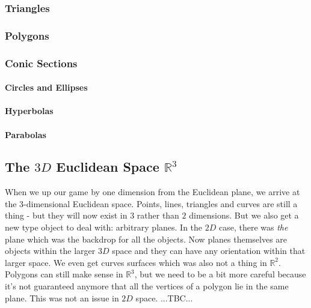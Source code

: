\subsubsection{Triangles}


\subsubsection{Polygons}


\subsubsection{Conic Sections}

\paragraph{Circles and Ellipses}

\paragraph{Hyperbolas}

\paragraph{Parabolas}






\subsection{The $3D$ Euclidean Space $\mathbb{R}^3$}
When we up our game by one dimension from the Euclidean plane, we arrive at the $3$-dimensional Euclidean space. Points, lines, triangles and curves are still a thing - but they will now exist in $3$ rather than $2$ dimensions. But we also get a new type object to deal with: arbitrary planes. In the $2D$ case, there was \emph{the} plane which was the backdrop for all the objects. Now planes themselves are objects within the larger $3D$ space and they can have any orientation within that larger space. We even get curves surfaces which was also not a thing in $\mathbb{R}^2$. Polygons can still make sense in $\mathbb{R}^3$, but we need to be a bit more careful because it's not guaranteed anymore that all the vertices of a polygon lie in the same plane. This was not an issue in $2D$ space. ...TBC...

